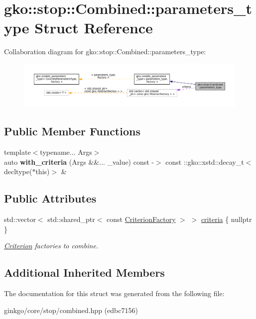 \hypertarget{structgko_1_1stop_1_1Combined_1_1parameters__type}{}\section{gko\+:\+:stop\+:\+:Combined\+:\+:parameters\+\_\+type Struct Reference}
\label{structgko_1_1stop_1_1Combined_1_1parameters__type}


Collaboration diagram for gko\+:\+:stop\+:\+:Combined\+:\+:parameters\+\_\+type\+:
\nopagebreak
\begin{figure}[H]
\begin{center}
\leavevmode
\includegraphics[width=350pt]{structgko_1_1stop_1_1Combined_1_1parameters__type__coll__graph}
\end{center}
\end{figure}
\subsection*{Public Member Functions}
\begin{DoxyCompactItemize}
\item 
\mbox{\label{structgko_1_1stop_1_1Combined_1_1parameters__type_ae9e759fd53bb4bef3e8899a5bb462eec}} 
{\footnotesize template$<$typename... Args$>$ }\\auto {\bfseries with\+\_\+criteria} (Args \&\&... \+\_\+value) const -\/$>$ const \+::gko\+::xstd\+::decay\+\_\+t$<$ decltype($\ast$this)$>$ \&
\end{DoxyCompactItemize}
\subsection*{Public Attributes}
\begin{DoxyCompactItemize}
\item 
\mbox{\label{structgko_1_1stop_1_1Combined_1_1parameters__type_a2ab63880c1758c42b3a175cd6b004635}} 
std\+::vector$<$ std\+::shared\+\_\+ptr$<$ const \hyperlink{namespacegko_1_1stop_ab12a51109c50b35ec36dc5a393d6a9a0}{Criterion\+Factory} $>$ $>$ \hyperlink{structgko_1_1stop_1_1Combined_1_1parameters__type_a2ab63880c1758c42b3a175cd6b004635}{criteria} \{ nullptr \}
\begin{DoxyCompactList}\small\item\em \hyperlink{classgko_1_1stop_1_1Criterion}{Criterion} factories to combine. \end{DoxyCompactList}\end{DoxyCompactItemize}
\subsection*{Additional Inherited Members}


The documentation for this struct was generated from the following file\+:\begin{DoxyCompactItemize}
\item 
ginkgo/core/stop/combined.\+hpp (edbc7156)\end{DoxyCompactItemize}
